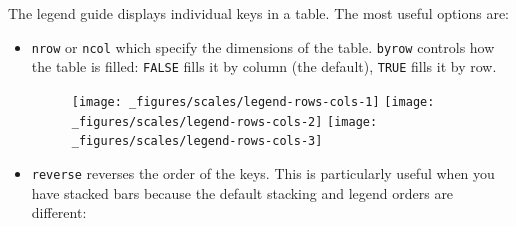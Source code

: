 The legend guide displays individual keys in a table. The most useful
options are: 

\begin{itemize}
\item
  \texttt{nrow} or \texttt{ncol} which specify the dimensions of the
  table. \texttt{byrow} controls how the table is filled: \texttt{FALSE}
  fills it by column (the default), \texttt{TRUE} fills it by row.

\begin{Shaded}
\begin{Highlighting}[]
\StringTok{ }\NormalTok{(} \NormalTok{, } \NormalTok{:}\NormalTok{, } \NormalTok{letters[}\NormalTok{:}\NormalTok{])}
\StringTok{ }\StringTok{ }\NormalTok{(}\NormalTok{(} 
\StringTok{ }\NormalTok{(} \NormalTok{(} \NormalTok{))}
\StringTok{ }\NormalTok{(} \NormalTok{(} \NormalTok{, } \NormalTok{))}
\end{Highlighting}
\end{Shaded}

  \begin{figure}[H]
    \texttt{[image: \_figures/scales/legend-rows-cols-1]}%
    \texttt{[image: \_figures/scales/legend-rows-cols-2]}%
    \texttt{[image: \_figures/scales/legend-rows-cols-3]}
  \end{figure}
\item
  \texttt{reverse} reverses the order of the keys. This is particularly
  useful when you have stacked bars because the default stacking and
  legend orders are different:

\begin{Shaded}
\begin{Highlighting}[]
\StringTok{ }\NormalTok{(}\StringTok{ }\NormalTok{(} \NormalTok{, }\NormalTok{(} 
\StringTok{ }\NormalTok{(} \NormalTok{(} \NormalTok{))}
\end{Highlighting}
\end{Shaded}


\end{itemize}
